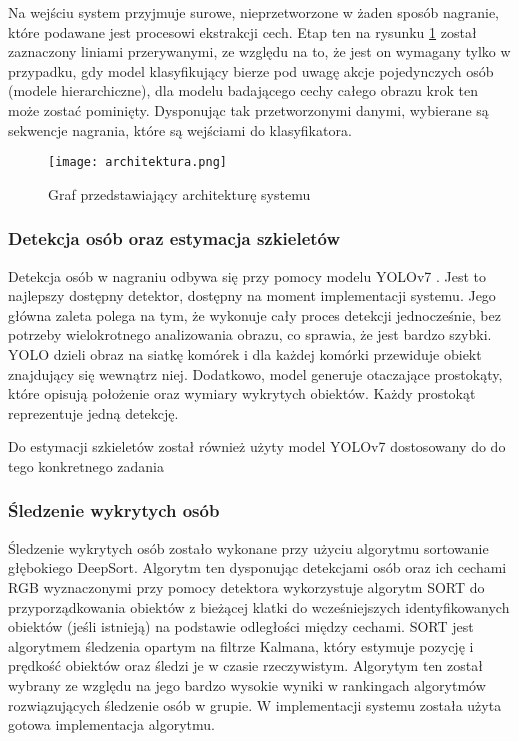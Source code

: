 Na wejściu system przyjmuje surowe, nieprzetworzone w żaden sposób nagranie, które podawane jest procesowi ekstrakcji cech. Etap ten na rysunku \ref{fig:architektura} został zaznaczony liniami przerywanymi, ze względu na to, że jest on wymagany tylko w przypadku, gdy model klasyfikujący bierze pod uwagę akcje pojedynczych osób (modele hierarchiczne), dla modelu badającego cechy całego obrazu krok ten może zostać pominięty. Dysponując tak przetworzonymi danymi, wybierane są sekwencje nagrania, które są wejściami do klasyfikatora.
\begin{figure}[!h]
    \centering \texttt{[image: architektura.png]}
    \caption{Graf przedstawiający architekturę systemu}
    \label{fig:architektura}
\end{figure}
\subsubsection{Detekcja osób oraz estymacja szkieletów}
Detekcja osób w nagraniu odbywa się przy pomocy modelu YOLOv7 \cite{yolov7}. Jest to najlepszy dostępny detektor,
dostępny na moment implementacji systemu. Jego główna zaleta polega na tym, że wykonuje cały proces detekcji jednocześnie, bez potrzeby wielokrotnego analizowania obrazu, co sprawia, że jest bardzo szybki. YOLO dzieli obraz na siatkę komórek i dla każdej komórki przewiduje obiekt znajdujący się wewnątrz niej. Dodatkowo, model generuje otaczające prostokąty, które opisują położenie oraz wymiary wykrytych obiektów. Każdy prostokąt reprezentuje jedną detekcję.

Do estymacji szkieletów został również użyty model YOLOv7 dostosowany do do tego konkretnego zadania
\subsubsection{Śledzenie wykrytych osób}
Śledzenie wykrytych osób zostało wykonane przy użyciu algorytmu sortowanie głębokiego DeepSort. Algorytm ten dysponując detekcjami osób oraz ich cechami RGB wyznaczonymi przy pomocy detektora wykorzystuje algorytm SORT do przyporządkowania obiektów z bieżącej klatki do wcześniejszych identyfikowanych obiektów (jeśli istnieją) na podstawie odległości między cechami. SORT jest algorytmem śledzenia opartym na filtrze Kalmana, który estymuje pozycję i prędkość obiektów oraz śledzi je w czasie rzeczywistym.
Algorytym ten został wybrany ze względu na jego bardzo wysokie wyniki w rankingach algorytmów rozwiązujących śledzenie osób w grupie.
W implementacji systemu została użyta gotowa implementacja \cite{deepsort} algorytmu.
